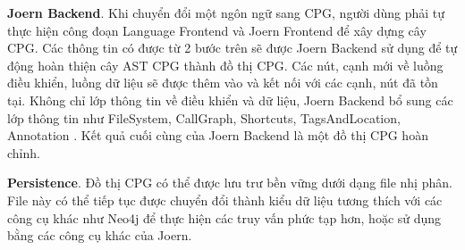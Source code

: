 \textbf{Joern Backend}. Khi chuyển đổi một ngôn ngữ sang CPG, người dùng phải tự thực hiện công đoạn Language Frontend và Joern Frontend để xây dựng cây CPG. Các thông tin có được từ 2 bước trên sẽ được Joern Backend sử dụng để tự động hoàn thiện cây AST CPG thành đồ thị CPG. Các nút, cạnh mới về luồng điều khiển, luồng dữ liệu sẽ được thêm vào và kết nối với các cạnh, nút đã tồn tại. Không chỉ lớp thông tin về điều khiển và dữ liệu, Joern Backend bổ sung các lớp thông tin như  FileSystem, CallGraph, Shortcuts, TagsAndLocation, Annotation \cite{joernCodeProperty}. Kết quả cuối cùng của Joern Backend là một đồ thị CPG hoàn chỉnh.

\textbf{Persistence}. Đồ thị CPG có thể được lưu trư bền vững dưới dạng file nhị phân. File này có thể tiếp tục được chuyển đổi thành kiểu dữ liệu tương thích với các công cụ khác như Neo4j để thực hiện các truy vấn phức tạp hơn, hoặc sử dụng bằng các công cụ khác của Joern.
